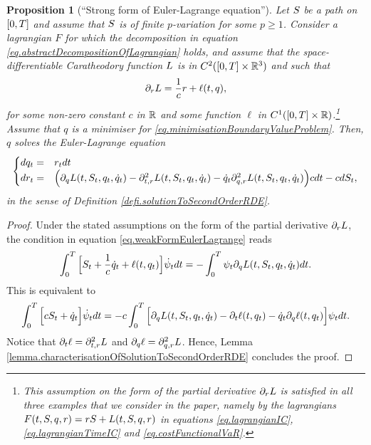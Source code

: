 \documentclass[10pt,a4paper]{article}
\newtheorem{prop}[thm]{Proposition}
\begin{document}
\begin{appendices}
\begin{prop}[``Strong form of Euler-Lagrange equation'']\label{prop.eulerLagrangeNecessity}
	 Let $S$ be  a path on ${[0,T]}$ and assume that $S$ is of finite $p$-variation for some $p\geq 1$. Consider a lagrangian $F$ for which the decomposition in equation \eqref{eq.abstractDecompositionOfLagrangian} holds, and assume that the space-differentiable Caratheodory function $L$ is in $C^{2}({[0,T]} \times \mathbb{R}^{3})$ and such that 
	 \begin{equation*}
	\partial_r L = \frac{1}{c}r + \ell(t,q),
	 \end{equation*}
	 for some non-zero constant $c$ in $\mathbb{R}$ and  some function $\ell$ in $C^{1}({[0,T]} \times \mathbb{R})$.\footnote{This assumption on the form of the partial derivative  $\partial_r L$ is satisfied in all three examples that we consider in the paper, namely by the lagrangians $F(t,S,q,r) = rS + L(t,S,q,r)$ in equations \eqref{eq.lagrangianIC}, \eqref{eq.lagrangianTimeIC} and \eqref{eq.costFunctionalVaR}.} Assume that $q$ is a minimiser for \eqref{eq.minimisationBoundaryValueProblem}. Then, $q$ solves the Euler-Lagrange equation 
	 \begin{equation}\label{eq.strongFormEulerLagrangeEquation}
	 \begin{cases}
	 dq_t =&r_t dt \\
	 dr_t = & \Big( \partial_q L (t,S_t,q_t,\dot{q}_t) - \partial^{2} _{t,r} L(t,S_t,q_t,\dot{q}_t) - \dot{q}_t \partial^{2} _{q,r} L(t,S_t,q_t,\dot{q}_t) \Big)c dt - cdS_t,
	 \end{cases}
	 \end{equation}
	 in the sense of Definition \ref{defi.solutionToSecondOrderRDE}.
\end{prop}
\begin{proof}
Under the stated assumptions on the form of the partial derivative $\partial_r L$, the condition in equation \eqref{eq.weakFormEulerLagrange} reads
	\begin{equation*}
	\int_{0}^{T} \Big[ S_t + \frac{1}{c}\dot{q}_t + \ell(t,q_t)\Big]\dot{\psi}_t dt 
	= - \int_{0}^{T} \psi_t \partial_q L (t,S_t,q_t,\dot{q}_t) dt . 
	\end{equation*}
	This is equivalent to 
	\begin{equation*}
	\int_{0}^{T} \Big[ cS_t + \dot{q}_t \Big]\dot{\psi}_t dt 
	= - c\int_{0}^{T} \Big[\partial_q L (t,S_t,q_t,\dot{q}_t) - \partial_t \ell (t,q_t) - \dot{q}_t \partial_q \ell  (t,q_t) \Big]\psi_t  dt . 
	\end{equation*}
	Notice that $\partial_t \ell = \partial^{2} _{t,r} L $ and $\partial_q \ell = \partial^{2} _{q,r} L$. Hence, Lemma \ref{lemma.characterisationOfSolutionToSecondOrderRDE} concludes the proof. 
\end{proof}
 
\end{appendices}

	
\end{document}
